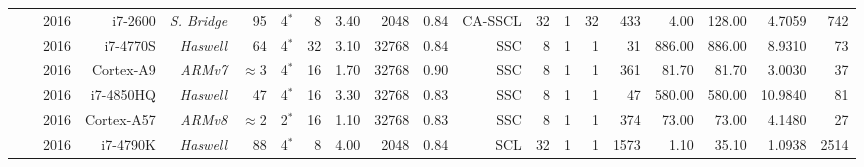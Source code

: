 \begin{table}
\begin{adjustbox}{angle=90}
{{\begin{tabular}{|r|r r|r r r r r r|r r|r r r r|r r|r r r|}
                                                                 & \cite{Sarkis2016}    & 2016          & i7-2600            & \textit{S. Bridge} &          95  &  4$^*$         &   8           & 3.40           &  2048    & 0.84     &   CA-SSCL          & 32            &    1             & 32                &     433           &    4.00          &  128.00       &  4.7059        &    742             \\
                                                                 & \cite{Giard2016b}    & 2016          & i7-4770S           & \textit{Haswell}   &          64  &  4$^*$         &  32           & 3.10           & 32768    & 0.84     &      SSC           &  8            &    1             &  1                &      31           &  886.00          &  886.00       &  8.9310        &     73             \\
                                                                 & \cite{Giard2016b}    & 2016          & Cortex-A9          & \textit{ARMv7}     &  $\approx$3  &  4$^*$         &  16           & 1.70           & 32768    & 0.90     &      SSC           &  8            &    1             &  1                &     361           &   81.70          &   81.70       &  3.0030        &     37             \\
                                                                 & \cite{Cassagne2016b} & 2016          & i7-4850HQ          & \textit{Haswell}   &          47  &  4$^*$         &  16           & 3.30           & 32768    & 0.83     &      SSC           &  8            &    1             &  1                &      47           &  580.00          &  580.00       & 10.9840        &     81             \\
                                                                 & \cite{Cassagne2016b} & 2016          & Cortex-A57         & \textit{ARMv8}     &  $\approx$2  &  2$^*$         &  16           & 1.10           & 32768    & 0.83     &      SSC           &  8            &    1             &  1                &     374           &   73.00          &   73.00       &  4.1480        &     27             \\
                                                                 & \cite{Shen2016}      & 2016          & i7-4790K           & \textit{Haswell}   &          88  &  4$^*$         &   8           & 4.00           &  2048    & 0.84     &       SCL          & 32            &    1             &  1                &    1573           &    1.10          &   35.10       &  1.0938        &   2514             \\

\end{tabular}}}
\end{adjustbox}
\end{table}
